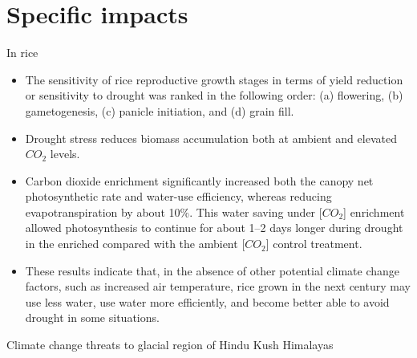 \documentclass[
  ignorenonframetext,
  aspectratio=169]{beamer}
\providecommand{\tightlist}{%
  \setlength{\itemsep}{0pt}\setlength{\parskip}{0pt}}
\begin{document}
\hypertarget{specific-impacts}{%
\section{Specific impacts}\label{specific-impacts}}

\begin{frame}{In rice}
\protect\hypertarget{in-rice}{}
\begin{itemize}
\tightlist
\item
  The sensitivity of rice reproductive growth stages in terms of yield
  reduction or sensitivity to drought was ranked in the following order:
  (a) flowering, (b) gametogenesis, (c) panicle initiation, and (d)
  grain fill.
\item
  Drought stress reduces biomass accumulation both at ambient and
  elevated \(CO_2\) levels.
\item
  Carbon dioxide enrichment significantly increased both the canopy net
  photosynthetic rate and water-use efficiency, whereas reducing
  evapotranspiration by about 10\%. This water saving under
  {[}\(CO_2\){]} enrichment allowed photosynthesis to continue for about
  1--2 days longer during drought in the enriched compared with the
  ambient {[}\(CO_2\){]} control treatment.
\item
  These results indicate that, in the absence of other potential climate
  change factors, such as increased air temperature, rice grown in the
  next century may use less water, use water more efficiently, and
  become better able to avoid drought in some situations.
\end{itemize}
\end{frame}

\begin{frame}{Climate change threats to glacial region of Hindu Kush
Himalayas}
\protect\hypertarget{climate-change-threats-to-glacial-region-of-hindu-kush-himalayas}{}
\end{frame}
\end{document}
